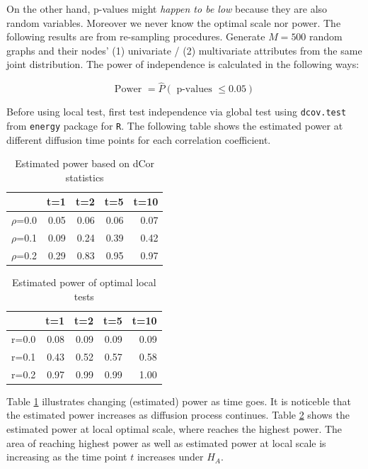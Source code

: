 \documentclass[12pt]{report}
\begin{document}
On the other hand, p-values might \textit{happen to be low} because they are also random variables. Moreover we never know the optimal scale nor power. The following results are from re-sampling procedures. Generate $M=500$ random graphs and their nodes' (1) univariate / (2) multivariate attributes from the same joint distribution. The power of independence is calculated in the following ways:

$$\mbox{Power } = \hat{P}(\mbox{ p-values } \leq 0.05)$$

Before using local test, first test independence via global test using \verb!dcov.test! from \verb!energy! package for \verb!R!. The following table shows the estimated power at different diffusion time points for each correlation coefficient. 


\begin{table}[ht]
\centering
\begin{tabular}{rrrrr}
  \hline
 & t=1 & t=2 & t=5 & t=10 \\ 
  \hline
$\rho$=0.0 & 0.05 & 0.06 & 0.06 & 0.07 \\ 
$\rho$=0.1 & 0.09 & 0.24 & 0.39 & 0.42 \\ 
$\rho$=0.2 & 0.29 & 0.83 & 0.95 & 0.97 \\ 
   \hline
\end{tabular}
\caption{Estimated power based on dCor statistics}
\label{tab:dcor}
\end{table}


\begin{table}[ht]
\centering
\begin{tabular}{rrrrr}
  \hline
 & t=1 & t=2 & t=5 & t=10 \\ 
  \hline
r=0.0 & 0.08 & 0.09 & 0.09 & 0.09 \\ 
  r=0.1 & 0.43 & 0.52 & 0.57 & 0.58 \\ 
  r=0.2 & 0.97 & 0.99 & 0.99 & 1.00 \\ 
   \hline
\end{tabular}
\caption{Estimated power of optimal local tests}
\label{tab:local}
\end{table}


Table \ref{tab:dcor} illustrates changing (estimated) power as time goes. It is noticeble that the estimated power increases as diffusion process continues. Table \ref{tab:local} shows the estimated power at local optimal scale, where reaches the highest power. The area of reaching highest power as well as estimated power at local scale is increasing as the time point $t$ increases under $H_{A}.$ 
\end{document}
